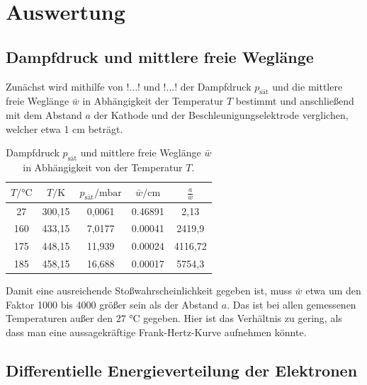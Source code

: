 \section{Auswertung}
\label{sec:Auswertung}

\subsection{Dampfdruck und mittlere freie Weglänge}

Zunächst wird mithilfe von  !...! und !...! der Dampfdruck $p_{\mathrm{sät}}$ und die mittlere
freie Weglänge $\bar{w}$ in Abhängigkeit der Temperatur $T$ bestimmt und anschließend mit dem
Abstand $a$ der Kathode und der Beschleunigungselektrode verglichen, welcher etwa 1 $\si{\centi\meter}$
beträgt.\\

\begin{table}[!h]
  \begin{center}
    \begin{tabular}{|c|c|c|c|c|}
      \hline
      $T / \si{\celsius}$ & $T / \si{\kelvin}$ & $p_{\mathrm{sät}} / \si{\milli\bar}$ & $\bar{w} / \si{\centi\meter}$ & $\frac{a}{\bar{w}}$\\
      \hline
      \hline
      27  & 300,15 & 0,0061  & 0.46891 & 2,13\\
      160 & 433,15 & 7,0177  & 0.00041 & 2419,9\\
      175 & 448,15 & 11,939  & 0.00024 & 4116,72\\
      185 & 458,15 & 16,688  & 0.00017 & 5754,3\\
      \hline
    \end{tabular}
    \caption{Dampfdruck $p_\mathrm{sät}$ und mittlere freie Weglänge $\bar{w}$ in Abhängigkeit von der Temperatur $T$.}
    \label{tab:weg}
  \end{center}
\end{table}

Damit eine ausreichende Stoßwahrscheinlichkeit gegeben ist, muss $\bar{w}$ etwa um den Faktor
1000 bis 4000 größer sein als der Abstand $a$. Das ist bei allen gemessenen Temperaturen außer
den $27 \, \, \si{\celsius}$ gegeben. Hier ist das Verhältnis zu gering, als dass man eine aussagekräftige
Frank-Hertz-Kurve aufnehmen könnte.\\

\subsection{Differentielle Energieverteilung der Elektronen}

